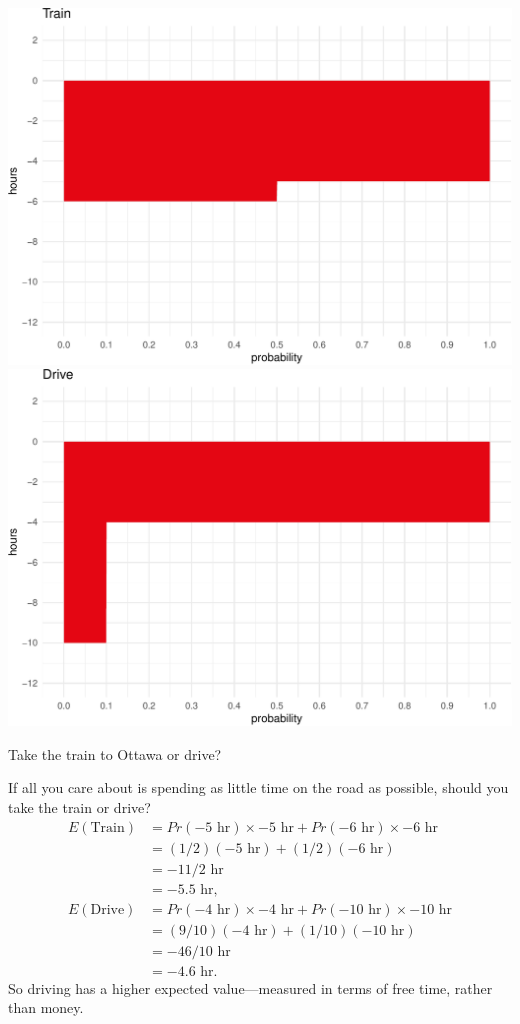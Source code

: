 \documentclass[justified]{tufte-book}
\newcommand{\p}{Pr}
\newcommand{\E}{E}
\theoremstyle{definition}
\theoremstyle{definition}
\theoremstyle{definition}
\theoremstyle{remark}
\begin{document}
\begin{marginfigure}
\includegraphics{_main_files/figure-latex/unnamed-chunk-93-1} \includegraphics{_main_files/figure-latex/unnamed-chunk-93-2} \caption[Take the train to Ottawa or drive?]{Take the train to Ottawa or drive?}\label{fig:unnamed-chunk-93}
\end{marginfigure}

If all you care about is spending as little time on the road as
possible, should you take the train or drive? \[
  \begin{aligned}
    \E(\mbox{Train}) &= \p(-5{\mbox{ hr}}) \times -5{\mbox{ hr}}+ \p(-6{\mbox{ hr}}) \times -6{\mbox{ hr}}\\
                     &= (1/2)(-5{\mbox{ hr}}) + (1/2)(-6{\mbox{ hr}})\\
                     &= -11/2{\mbox{ hr}}\\
                     &= -5.5{\mbox{ hr}},\\
    \E(\mbox{Drive}) &= \p(-4{\mbox{ hr}}) \times -4{\mbox{ hr}}+ \p(-10{\mbox{ hr}}) \times -10{\mbox{ hr}}\\
                     &= (9/10)(-4{\mbox{ hr}}) + (1/10)(-10{\mbox{ hr}})\\
                     &= -46/10{\mbox{ hr}}\\
                     &= -4.6{\mbox{ hr}}.
  \end{aligned}
\] So driving has a higher expected value---measured in terms of free
time, rather than money.
\end{document}
